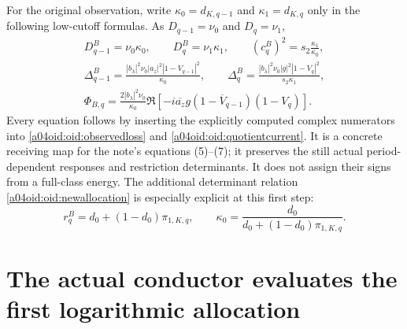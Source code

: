 For the original observation, write
$\kappa_0=d_{K,q-1}$ and $\kappa_1=d_{K,q}$ only in the following
low-cutoff formulas. As $D_{q-1}=\nu_0$ and $D_q=\nu_1$,
\begin{equation}\label{a04oid:oid:lowobservation}
\begin{gathered}
 D_{q-1}^B=\nu_0\kappa_0,\qquad
 D_q^B=\nu_1\kappa_1,\qquad
 (c_q^B)^2=s_2\frac{\kappa_1}{\kappa_0},\\
 \Delta_{q-1}^B=
 \frac{|b_\lambda|^2\nu_0|a_z|^2|1-V_{q-1}|^2}{\kappa_0},
 \qquad
 \Delta_q^B=
 \frac{|b_\lambda|^2\nu_0|g|^2|1-V_q|^2}{s_2\kappa_1},\\
 \boxed{\Phi_{B,q}=
 \frac{2|b_\lambda|^2\nu_0}{\kappa_0}
 \Re\left[-i\overline{a_z}g
 (1-\overline V_{q-1})(1-V_q)\right].}
\end{gathered}
\end{equation}
Every equation follows by inserting the explicitly computed complex
numerators into \eqref{a04oid:oid:observedloss} and
\eqref{a04oid:oid:quotientcurrent}. It is a concrete receiving map for the
note's equations (5)--(7); it preserves the still actual
period-dependent responses and restriction determinants.
It does not assign their signs from a full-class energy.
The additional determinant relation \eqref{a04oid:oid:newallocation} is
especially explicit at this first step:
\begin{equation}\label{a04oid:oid:lowallocation}
 \boxed{r_q^B=d_0+(1-d_0)\pi_{1,K,q},\qquad
 \kappa_0=\frac{d_0}{d_0+(1-d_0)\pi_{1,K,q}}.}
\end{equation}

\section{The actual conductor evaluates the first logarithmic allocation}

